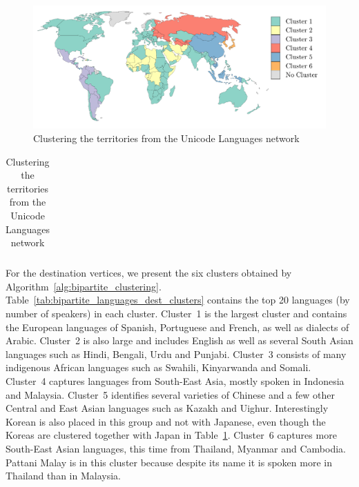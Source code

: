 \begin{figure}[H]
	\centering
	\includegraphics[scale=0.6, draft=false]{../../results/languages/languages_source_map_clusts.pdf}
	\caption{Clustering the territories from the Unicode Languages network}
	\label{fig:bipartite_languages_map}
\end{figure}




\begin{table}[H]
\centering
\scriptsize
	\begin{tabular}{ |c|c|c|c|c|c| }
		\hline	
		\rule{0pt}{1.2em}
		 \\[0.1cm]	
		\hline	
	\end{tabular}
	\caption{Clustering the territories from the Unicode Languages network}
	\label{tab:bipartite_languages_source_clusters}
\end{table}






For the destination vertices, we present the six clusters obtained by Algorithm~\ref{alg:bipartite_clustering}.
Table~\ref{tab:bipartite_languages_dest_clusters} contains the top 20 languages (by number of speakers) in each cluster.
Cluster~1 is the largest cluster and contains the European languages of Spanish, Portuguese and French, as well as dialects of Arabic. 
Cluster~2 is also large and includes English as well as several South Asian languages such as Hindi, Bengali, Urdu and Punjabi.
Cluster~3 consists of many indigenous African languages such as Swahili, Kinyarwanda and Somali.
Cluster~4 captures languages from South-East Asia, mostly spoken in Indonesia and Malaysia.
Cluster~5 identifies several varieties of Chinese and a few other Central and East Asian languages such as Kazakh and Uighur. Interestingly Korean is also placed in this group and not with Japanese, even though the Koreas are clustered together with Japan in Table~\ref{tab:bipartite_languages_source_clusters}.
Cluster~6 captures more South-East Asian languages, this time from Thailand, Myanmar and Cambodia. Pattani Malay is in this cluster because despite its name it is spoken more in Thailand than in Malaysia.



